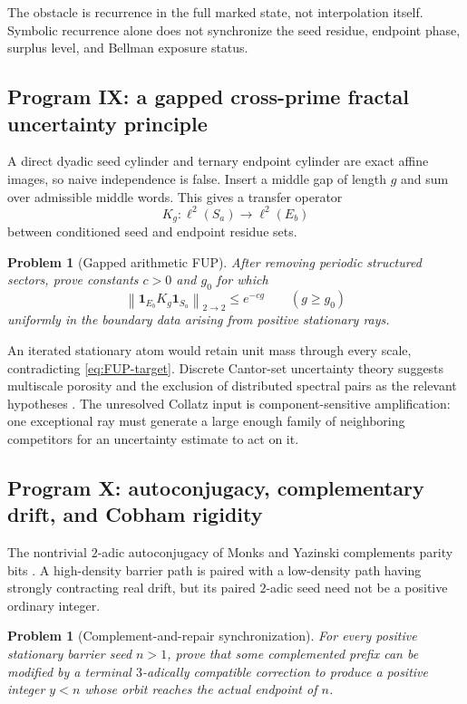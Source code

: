 \documentclass[11pt,reqno]{amsart}
\numberwithin{equation}{section}
\newtheorem{problem}[theorem]{Problem}
\theoremstyle{definition}
\theoremstyle{remark}
\newcommand{\one}{\mathbf 1}
\begin{document}
The obstacle is recurrence in the full marked state, not interpolation
itself.  Symbolic recurrence alone does not synchronize the seed residue,
endpoint phase, surplus level, and Bellman exposure status.

\subsection{Program IX: a gapped cross-prime fractal uncertainty principle}

A direct dyadic seed cylinder and ternary endpoint cylinder are exact affine
images, so naive independence is false.  Insert a middle gap of length $g$
and sum over admissible middle words.  This gives a transfer operator
\[
K_g:\ell^2(S_a)\longrightarrow\ell^2(E_b)
\]
between conditioned seed and endpoint residue sets.

\begin{problem}[Gapped arithmetic FUP]\label{prob:FUP}
After removing periodic structured sectors, prove constants $c>0$ and
$g_0$ for which
\begin{equation}\label{eq:FUP-target}
\left\|
\one_{E_b}K_g\one_{S_a}
\right\|_{2\to2}
\le e^{-cg}
\qquad(g\ge g_0)
\end{equation}
uniformly in the boundary data arising from positive stationary rays.
\end{problem}

An iterated stationary atom would retain unit mass through every scale,
contradicting \eqref{eq:FUP-target}.  Discrete Cantor-set uncertainty theory
suggests multiscale porosity and the exclusion of distributed spectral pairs
as the relevant hypotheses \cite{LaiShi2025}.  The unresolved Collatz input
is component-sensitive amplification: one exceptional ray must generate a
large enough family of neighboring competitors for an uncertainty estimate
to act on it.

\subsection{Program X: autoconjugacy, complementary drift, and Cobham rigidity}

The nontrivial $2$-adic autoconjugacy of Monks and Yazinski complements parity
bits \cite{MonksYazinski2004}.  A high-density barrier path is paired with a
low-density path having strongly contracting real drift, but its paired
$2$-adic seed need not be a positive ordinary integer.

\begin{problem}[Complement-and-repair synchronization]\label{prob:autoconjugacy-repair}
For every positive stationary barrier seed $n>1$, prove that some complemented
prefix can be modified by a terminal $3$-adically compatible correction to
produce a positive integer $y<n$ whose orbit reaches the actual endpoint of
$n$.
\end{problem}
\end{document}
